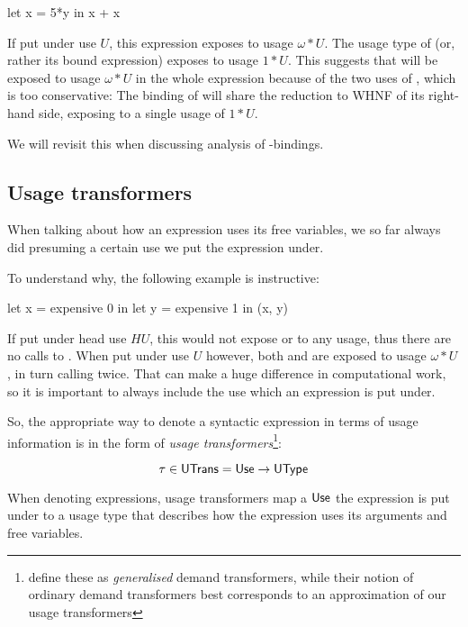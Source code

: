\begin{haskellcode}
let x = 5*y
in x + x
\end{haskellcode}

If put under use $U$, this expression exposes  to usage $\omega*U$. 
The usage type of  (or, rather its bound expression) exposes  to usage $1*U$.
This suggests that  will be exposed to usage $\omega*U$ in the whole expression because of the two uses of , which is too conservative:
The binding of  will share the reduction to WHNF of its right-hand side, exposing  to a single usage of $1*U$.

We will revisit this when discussing analysis of -bindings.

\subsection{Usage transformers}\label{sec:utrans}

When talking about how an expression uses its free variables, we so far always did presuming a certain use we put the expression under.

To understand why, the following example is instructive:

\begin{haskellcode}
let x = expensive 0
in let y = expensive 1
   in (x, y)
\end{haskellcode}

If put under head use $HU$, this would not expose  or  to any usage, thus there are no calls to .
When put under use $U$ however, both  and  are exposed to usage $\omega*U$, in turn calling  twice.
That can make a huge difference in computational work, so it is important to always include the use which an expression is put under.

So, the appropriate way to denote a syntactic expression in terms of usage information is in the form of \emph{usage transformers}\footnote{\textcite{card} define these as \emph{generalised} demand transformers, while their notion of ordinary demand transformers best corresponds to an approximation of our usage transformers}:

\[
\tau \in \text{\textsf{UTrans}} = \text{\textsf{Use}} \to \text{\textsf{UType}}
\]

When denoting expressions, usage transformers map a $\text{\textsf{Use}}$ the expression is put under to a usage type that describes how the expression uses its arguments and free variables.

